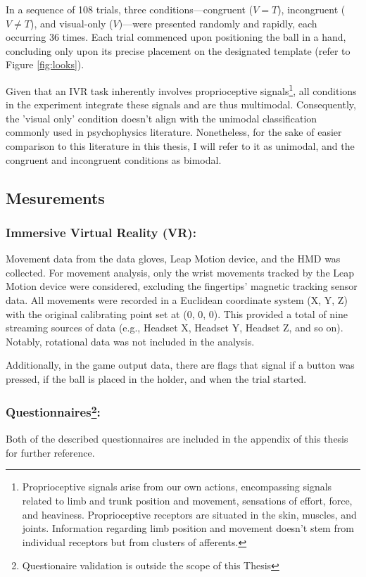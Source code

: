 \documentclass[12pt,oneside,openright]{report}
\begin{document}
In a sequence of 108 trials, three conditions—congruent ($V=T$), incongruent ($V \neq T$), and visual-only ($V$)—were presented randomly and rapidly, each occurring 36 times. Each trial commenced upon positioning the ball in a hand, concluding only upon its precise placement on the designated template (refer to Figure \ref{fig:looks}). 

Given that an IVR task inherently involves proprioceptive signals\footnote{Proprioceptive signals arise from our own actions, encompassing signals related to limb and trunk position and movement, sensations of effort, force, and heaviness. Proprioceptive receptors are situated in the skin, muscles, and joints. Information regarding limb position and movement doesn't stem from individual receptors but from clusters of afferents\parencite{Proske2012ThePS}.}, all conditions in the experiment integrate these signals and are thus multimodal. Consequently, the 'visual only' condition doesn't align with the unimodal classification commonly used in psychophysics literature. Nonetheless, for the sake of easier comparison to this literature in this thesis, I will refer to it as unimodal, and the congruent and incongruent conditions as bimodal.


\subsection*{Mesurements}
\subsubsection*{Immersive Virtual Reality (VR):}

Movement data from the data gloves, Leap Motion device, and the HMD was collected. For movement analysis, only the wrist movements tracked by the Leap Motion device were considered, excluding the fingertips' magnetic tracking sensor data. All movements were recorded in a Euclidean coordinate system (X, Y, Z) with the original calibrating point set at (0, 0, 0). This provided a total of nine streaming sources of data (e.g., Headset X, Headset Y, Headset Z, and so on). Notably, rotational data was not included in the analysis.

Additionally, in the game output data, there are flags that signal if a button was pressed, if the ball is placed in the holder, and when the trial started.

\subsubsection*{Questionnaires\footnote{Questionaire validation is outside the scope of this Thesis}:}
Both of the described questionnaires are included in the appendix of this thesis for further reference.
\end{document}
